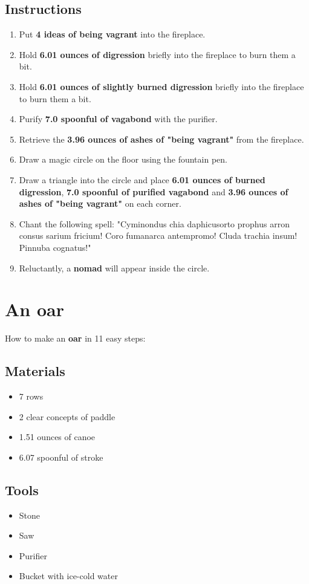 \documentclass{article}
\begin{document}
\subsection{Instructions}\begin{enumerate}
\item 
Put \textbf{4 ideas of being vagrant} into the fireplace.
\item 
Hold \textbf{6.01 ounces of digression} briefly into the fireplace to burn them a bit.
\item 
Hold \textbf{6.01 ounces of slightly burned digression} briefly into the fireplace to burn them a bit.
\item 
Purify \textbf{7.0 spoonful of vagabond} with the purifier.
\item 
Retrieve the \textbf{3.96 ounces of ashes of "being vagrant"} from the fireplace.
\item 
Draw a magic circle on the floor using the fountain pen.
\item 
Draw a triangle into the circle and place \textbf{6.01 ounces of burned digression}, \textbf{7.0 spoonful of purified vagabond} and \textbf{3.96 ounces of ashes of "being vagrant"} on each corner.
\item 
Chant the following spell: "Cyminondus chia daphicusorto prophus arron consus sarium fricium! Coro fumanarca antempromo! Cluda trachia insum! Pinnuba cognatus!"
\item 
Reluctantly, a \textbf{nomad} will appear inside the circle.
\end{enumerate}
\newpage
\section{An oar}How to make an \textbf{oar} in 11 easy steps:

\subsection{Materials}\begin{itemize}
\item 
7 rows
\item 
2 clear concepts of paddle
\item 
1.51 ounces of canoe
\item 
6.07 spoonful of stroke
\end{itemize}
\subsection{Tools}\begin{itemize}
\item 
Stone
\item 
Saw
\item 
Purifier
\item 
Bucket with ice-cold water
\end{itemize}
\end{document}

